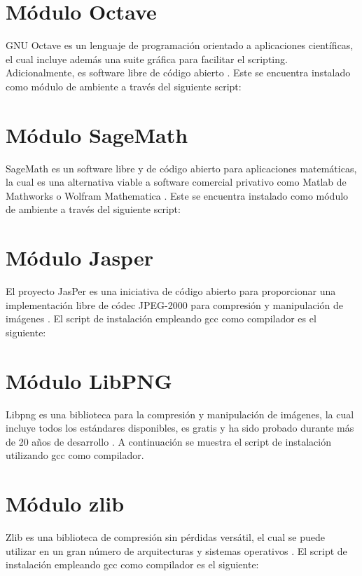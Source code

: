 


%
%

\section{Módulo Octave}
GNU Octave es un lenguaje de programación orientado a aplicaciones científicas, el cual incluye además una suite gráfica para facilitar el scripting. Adicionalmente, es software libre de código abierto \cite{octave}. Este se encuentra instalado como módulo de ambiente a través del siguiente script:



\section{Módulo SageMath}
SageMath es un software libre y de código abierto para aplicaciones matemáticas, la cual es una alternativa viable a software comercial privativo como Matlab de Mathworks o Wolfram Mathematica \cite{sage}. Este se encuentra instalado como módulo de ambiente a través del siguiente script:




\section{Módulo Jasper}
El proyecto JasPer es una iniciativa de código abierto para proporcionar una implementación libre de códec JPEG-2000 para compresión y manipulación de imágenes \cite{jasper}. El script de instalación empleando gcc como compilador es el siguiente:


\section{Módulo LibPNG}
Libpng es una biblioteca para la compresión y manipulación de imágenes, la cual incluye todos los estándares disponibles, es gratis y ha sido probado durante más de 20 años de desarrollo \cite{libpng}. A continuación se muestra el script de instalación utilizando gcc como compilador.



\section{Módulo zlib}
Zlib es una biblioteca de compresión sin pérdidas versátil, el cual se puede utilizar en un gran número de arquitecturas y sistemas operativos \cite{zlib}. El script de instalación empleando gcc como compilador es el siguiente:


